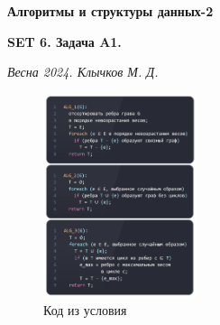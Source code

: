\documentclass[11pt,a4paper]{scrarticle}
\author{Клычков Максим Дмитриевич}
\theoremstyle{definition}
\begin{document}
\centerline{\textbf{\huge Алгоритмы и структуры данных-2}}
\centerline{\textbf{SET 6. Задача A1.}}
\begin{flushright}
    \emph{Весна 2024. Клычков М. Д.}
\end{flushright}

\begin{figure}[htp]
    \centering
    \includegraphics[width=0.4\textwidth]{static/code.png}
    \caption{Код из условия}
    \label{fig:code}
\end{figure}
\end{document}
